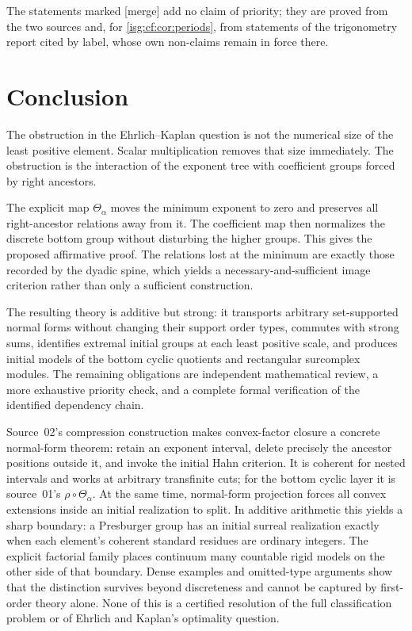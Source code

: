 \documentclass[11pt]{article}
\theoremstyle{definition}
\theoremstyle{remark}
\newcommand{\tht}{\Theta_{\alpha}}
\begin{document}
The statements marked \textup{[merge]} add no claim of priority; they are
proved from the two sources and, for \cref{isg:cf:cor:periods}, from
statements of the trigonometry report cited by label, whose own
non-claims remain in force there.

\section{Conclusion}\label{isg:sec:conclusion}
The obstruction in the Ehrlich--Kaplan question is not the numerical
size of the least positive element. Scalar multiplication removes that
size immediately. The obstruction is the interaction of the exponent
tree with coefficient groups forced by right ancestors.

The explicit map $\Theta_\alpha$ moves the minimum exponent to zero
and preserves all right-ancestor relations away from it. The coefficient
map then normalizes the discrete bottom group without disturbing the
higher groups. This gives the proposed affirmative proof. The relations
lost at the minimum are exactly those recorded by the dyadic spine,
which yields a necessary-and-sufficient image criterion rather than
only a sufficient construction.

The resulting theory is additive but strong: it transports arbitrary
set-supported normal forms without changing their support order types,
commutes with strong sums, identifies extremal initial groups at each
least positive scale, and produces initial models of the bottom cyclic
quotients and rectangular surcomplex modules. The remaining obligations
are independent mathematical review, a more exhaustive priority check,
and a complete formal verification of the identified dependency chain.

Source~02's compression construction makes convex-factor closure a
concrete normal-form theorem: retain an exponent interval, delete
precisely the ancestor positions outside it, and invoke the initial Hahn
criterion. It is coherent for nested intervals and works at arbitrary
transfinite cuts; for the bottom cyclic layer it is source~01's
$\rho\circ\tht$. At the same time, normal-form projection forces all
convex extensions inside an initial realization to split. In additive
arithmetic this yields a sharp boundary: a Presburger group has an
initial surreal realization exactly when each element's coherent
standard residues are ordinary integers. The explicit factorial family
places continuum many countable rigid models on the other side of that
boundary. Dense examples and omitted-type arguments show that the
distinction survives beyond discreteness and cannot be captured by
first-order theory alone. None of this is a certified resolution of the
full classification problem or of Ehrlich and Kaplan's optimality
question.
\end{document}
